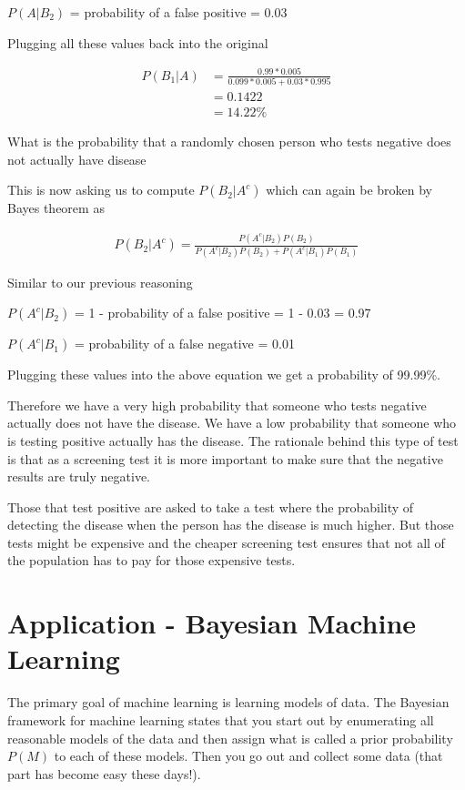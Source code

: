 \documentclass[12pt]{article}
\begin{document}
$P(A|B_2)$ = probability of a false positive = 0.03

Plugging all these values back into the original 

\begin{align*}
P(B_1|A) &= \frac{0.99*0.005}{0.099*0.005 + 0.03 * 0.995} \\
&= 0.1422 \\
&= 14.22\%
\end{align*} 

What is the probability that a randomly chosen person who tests negative does not actually have disease

This is now asking us to compute $P(B_2|A^c)$ which can again be broken by Bayes theorem as 

\begin{align*}
P(B_2|A^c) = \frac{P(A^c|B_2)P(B_2)}{P(A^c|B_2)P(B_2) + P(A^c|B_1)P(B_1)}
\end{align*}

Similar to our previous reasoning

$P(A^c|B_2)$ = 1 - probability of a false positive = 1 - 0.03 = 0.97

$P(A^c|B_1)$ = probability of a false negative = 0.01

Plugging these values into the above equation we get a probability of 99.99\%.

Therefore we have a very high probability that someone who tests negative actually does not have the disease. We have a low probability that someone who is testing positive actually has the disease. The rationale behind this type of test is that as a screening test it is more important to make sure that the negative results are truly negative. 

Those that test positive are asked to take a test where the probability of detecting the disease when the person has the disease is much higher. But those tests might be expensive and the cheaper screening test ensures that not all of the population has to pay for those expensive tests.

\section*{Application - Bayesian Machine Learning}

The primary goal of machine learning is learning models of data. 
The Bayesian framework for machine learning states that you start out by enumerating all reasonable models of the data and then assign what is called a prior probability $P(M)$ to each of these models. Then you go out and collect some data (that part has become easy these days!). 
\end{document}

